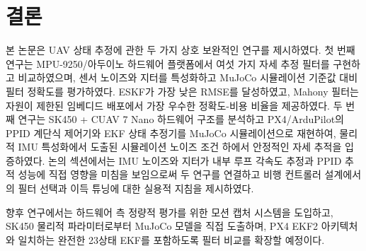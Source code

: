 \section{결론}
\label{sec:conclusion}

본 논문은 UAV 상태 추정에 관한 두 가지 상호 보완적인 연구를 제시하였다.
첫 번째 연구는 MPU-9250/아두이노 하드웨어 플랫폼에서 여섯 가지 자세 추정 필터를 구현하고 비교하였으며,
센서 노이즈와 지터를 특성화하고 MuJoCo 시뮬레이션 기준값 대비 필터 정확도를 평가하였다.
ESKF가 가장 낮은 RMSE를 달성하였고, Mahony 필터는 자원이 제한된 임베디드 배포에서
가장 우수한 정확도-비용 비율을 제공하였다.
두 번째 연구는 SK450 + CUAV 7 Nano 하드웨어 구조를 분석하고
PX4/ArduPilot의 PPID 계단식 제어기와 EKF 상태 추정기를 MuJoCo 시뮬레이션으로 재현하여,
물리적 IMU 특성화에서 도출된 시뮬레이션 노이즈 조건 하에서 안정적인 자세 추적을 입증하였다.
논의 섹션에서는 IMU 노이즈와 지터가 내부 루프 각속도 추정과 PPID 추적 성능에 직접 영향을 미침을 보임으로써
두 연구를 연결하고 비행 컨트롤러 설계에서의 필터 선택과 이득 튜닝에 대한 실용적 지침을 제시하였다.

향후 연구에서는 하드웨어 측 정량적 평가를 위한 모션 캡처 시스템을 도입하고,
SK450 물리적 파라미터로부터 MuJoCo 모델을 직접 도출하며,
PX4 EKF2 아키텍처와 일치하는 완전한 23상태 EKF를 포함하도록 필터 비교를 확장할 예정이다.
